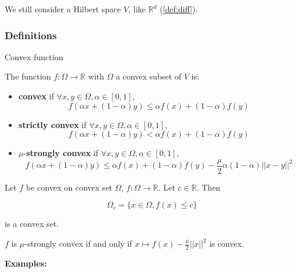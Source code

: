 \documentclass[
10pt, %
a4paper, %
oneside, %
headinclude,footinclude, %
BCOR5mm, %
]{scrartcl}
\begin{document}
We still consider a Hilbert space $V$, like $ \mathbb{R}^d$ (\ref{def:diff}).

\subsubsection{\large\color{Periwinkle}Definitions}

\begin{definition}{Convex function}
    \label{def:convexity}

    The function $f:\Omega \rightarrow \mathbb{R} $ with $\Omega$ a convex subset of $V$ is:
    \begin{itemize}
	\item \textbf{{convex}} if $\forall x, y\in \Omega, \alpha\in [0,1]$,
	    \begin{equation*}
		f(\alpha x+(1-\alpha)y)\leq \alpha f(x)+(1-\alpha)f(y)
	    \end{equation*}
	\item \textbf{{strictly convex}} if $\forall x, y\in \Omega, \alpha\in [0,1]$,
	    \begin{equation*}
		f(\alpha x+(1-\alpha)y)< \alpha f(x)+(1-\alpha)f(y)
	    \end{equation*}
	\item $\mu$-\textbf{{strongly convex}} if $\forall x, y\in \Omega, \alpha\in [0,1]$,
	    \begin{equation*}
		f(\alpha x+(1-\alpha)y)\leq \alpha f(x)+(1-\alpha)f(y)- \frac{\mu}{2} \alpha(1-\alpha)||x-y||^2
	    \end{equation*}
    \end{itemize}
\end{definition}

\begin{lemma} Let $f$ be convex on convex set $ \Omega$, $f:\Omega \rightarrow \mathbb{R} $.  Let $c\in \mathbb{R} $. Then

\begin{equation*}
    \Omega_c = \{x\in \Omega, f(x)\leq c\}
\end{equation*}
 
 is a convex set.
\end{lemma}

\begin{proposition}
    $f$ is $ \mu$-strongly convex if and only if $ x\mapsto f(x)- \frac{\mu}{2} ||x||^2$ is convex.
\end{proposition}

\textbf{{Examples:}} 
\end{document}
